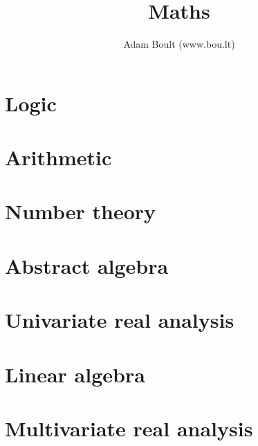 \documentclass[oneside]{book}
\begin{document}
\author{Adam Boult (www.bou.lt)}
\title{Maths}
\maketitle

\setcounter{tocdepth}{1}
\tableofcontents



\part{Logic}




\part{Arithmetic}






\part{Number theory}











\part{Abstract algebra}




\part{Univariate real analysis}











\part{Linear algebra}









\part{Multivariate real analysis}







\end{document}
